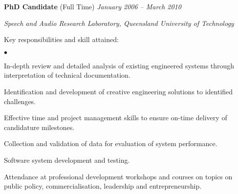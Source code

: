 \documentclass[margin,line]{resume}
\newenvironment{list1}{
  \begin{list}{}{%
      \setlength{\itemsep}{0in}
      \setlength{\parsep}{0in} \setlength{\parskip}{0in}
      \setlength{\topsep}{0in} \setlength{\partopsep}{0in}
      \setlength{\leftmargin}{0.17in}}}{\end{list}}
\newenvironment{list2}{
  \begin{list}{$\bullet$}{%
      \setlength{\itemsep}{0in}
      \setlength{\parsep}{0in} \setlength{\parskip}{0in}
      \setlength{\topsep}{0in} \setlength{\partopsep}{0in}
      \setlength{\leftmargin}{0.2in}}}{\end{list}}
\begin{document}
\begin{resume}
{\textbf{PhD Candidate} (Full Time)} \hfill {\it January 2006 -- March 2010}\\
\vspace{-0.85\baselineskip}
\begin{list1}
\item {\it Speech and Audio Research Laboratory, Queensland University of Technology}
\item Key responsibilities and skill attained: %
%
%
\begin{list2}
\item In-depth review and detailed analysis of existing engineered systems through interpretation of technical documentation.
\item Identification and development of creative engineering solutions to identified challenges.
\item Effective time and project management skills to ensure on-time delivery of candidature milestones.
\item Collection and validation of data for evaluation of system performance.
\item Software system development and testing.
\item Attendance at professional development workshops and courses on topics on public policy, commercialisation, leadership and entrepreneurship.

\end{list2}
\end{list1}


\end{resume}
\end{document}

